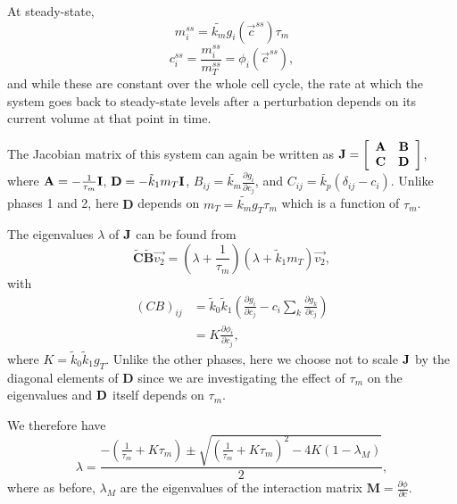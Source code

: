 \documentclass[10pt]{article}
\begin{document}
At steady-state,
\begin{equation}
    m_i^{ss} = \tilde{k_m} g_i(\vec{c}^{ss}) \tau_m 
\end{equation}
\begin{equation}
    c_i^{ss} = \frac{m_i^{ss}}{m_T^{ss}} = \phi_i(\vec{c}^{ss}),
\end{equation}
and while these are constant over the whole cell cycle, the rate at which the system goes back to steady-state levels after a perturbation depends on its current volume at that point in time. 

The Jacobian matrix of this system can again be written as $\bf{J} = \left[\begin{array}{cc}
\bf{A} & \bf{B} \\
\bf{C} & \bf{D} \\
\end{array} \right]$, where $\textbf{A} = -\frac{1}{\tau_m} \bf{I}$, $\textbf{D} = -\tilde{k}_1 m_T \bf{I}$, $B_{ij} = \tilde{k_m} \frac{\partial g_i}{\partial c_j}$, and $C_{ij} = \tilde{k_p}(\delta_{ij}-c_i)$. Unlike phases 1 and 2, here $\textbf{D}$ depends on $m_T = \tilde{k_m} g_T \tau_m$ which is a function of $\tau_m$. 

The eigenvalues $\lambda$ of $\bf{J}$ can be found from
\begin{equation}
    \tilde{\textbf{C}}\tilde{\textbf{B}} \overrightarrow{v_2} = \left(\lambda+\frac{1}{\tau_m} \right) \left(\lambda + \tilde{k}_1 m_T \right) \overrightarrow{v_2},      
\end{equation}
with
\begin{equation}
\begin{split}
    (CB)_{ij} &= \tilde{k}_0 \tilde{k}_1 \left(\frac{\partial g_i}{\partial c_j} - c_i \sum_k \frac{\partial g_k}{\partial c_j} \right) \\
    &= K \frac{\partial \phi_i}{\partial c_j},
\end{split}
\end{equation}
where $K = \tilde{k}_0 \tilde{k}_1 g_T$. Unlike the other phases, here we choose not to scale $\bf{J}$ by the diagonal elements of $\textbf{D}$ since we are investigating the effect of $\tau_m$ on the eigenvalues and $\bf{D}$ itself depends on $\tau_m$.

We therefore have
\begin{equation}
    \lambda = \frac{-\left(\frac{1}{\tau_m}+K\tau_m\right) \pm \sqrt{\left(\frac{1}{\tau_m}+K\tau_m\right)^2 - 4K(1-\lambda_M)}}{2},
\end{equation}
where as before, $\lambda_M$ are the eigenvalues of the interaction matrix $\mathbf{M} = \frac{\partial \phi}{\partial c}$.
\end{document}
